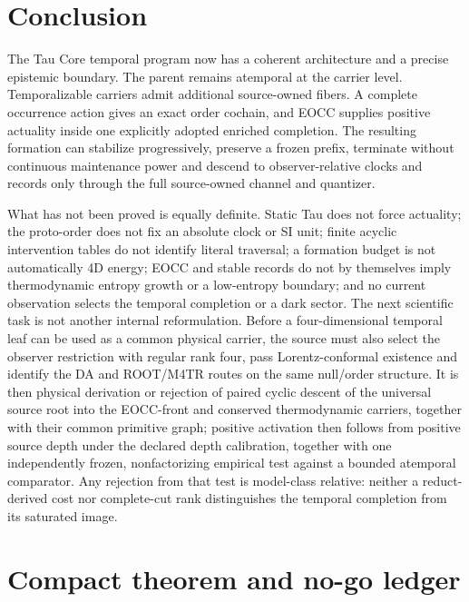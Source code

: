 \documentclass[11pt]{article}
\begin{document}
\section{Conclusion}

The Tau Core temporal program now has a coherent architecture and a precise
epistemic boundary.  The parent remains atemporal at the carrier level.
Temporalizable carriers admit additional source-owned fibers.  A complete
occurrence action gives an exact order cochain, and EOCC supplies positive
actuality inside one explicitly adopted enriched completion.  The resulting
formation can stabilize progressively, preserve a frozen prefix, terminate
without continuous maintenance power and descend to observer-relative clocks
and records only through the full source-owned channel and quantizer.

What has not been proved is equally definite.  Static Tau does not force
actuality; the proto-order does not fix an absolute clock or SI unit; finite
acyclic intervention tables do not identify literal traversal; a formation
budget is not automatically 4D energy; EOCC and stable records do not by
themselves imply thermodynamic entropy growth or a low-entropy boundary; and
no current observation selects the
temporal completion or a dark sector.  The next scientific task is not
another internal reformulation.  Before a four-dimensional temporal leaf can
be used as a common physical carrier, the source must also select the
observer restriction with regular rank four, pass Lorentz-conformal existence
and identify the DA and ROOT/M4TR routes on the same null/order structure.
It is then physical derivation or rejection of
paired cyclic descent of the universal source root into the EOCC-front and
conserved thermodynamic carriers, together with their common primitive graph;
positive activation then follows from positive source depth under the declared
depth calibration, together with one
independently frozen, nonfactorizing empirical test against a bounded
atemporal comparator.  Any rejection from that test is model-class relative:
neither a reduct-derived cost nor complete-cut rank distinguishes the temporal
completion from its saturated image.

\appendix

\section{Compact theorem and no-go ledger}
\end{document}
